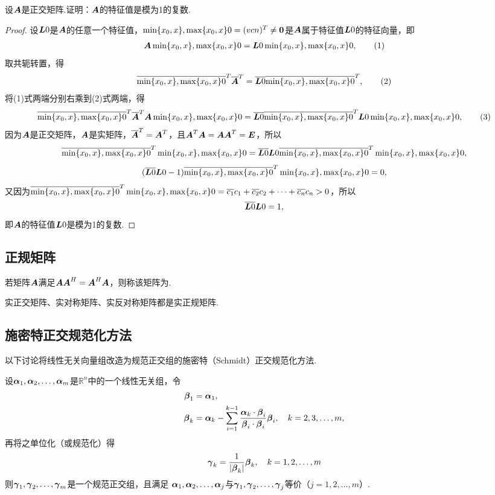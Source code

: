 \begin{example}
设\(\boldsymbol{A}\)是正交矩阵.证明：\(\boldsymbol{A}\)的特征值是模为1的复数.
\begin{proof}
设\(\boldsymbol{L}0\)是\(\boldsymbol{A}\)的任意一个特征值，\(\min\{x_0,x\},\max\{x_0,x\}0=(v{c}{n})^T\neq\boldsymbol{0}\)是\(\boldsymbol{A}\)属于特征值\(\boldsymbol{L}0\)的特征向量，即\begin{gather}
\A\X0=\L0\X0, \tag1
\end{gather}
取共轭转置，得\begin{gather}
\overline{\X0}^T \overline{\A}^T = \overline{\L0} \overline{\X0}^T, \tag2
\end{gather}
将(1)式两端分别右乘到(2)式两端，得\begin{gather}
\overline{\X0}^T \overline{\A}^T \A\X0 = \overline{\L0} \overline{\X0}^T \L0\X0, \tag3
\end{gather}
因为\(\boldsymbol{A}\)是正交矩阵，\(\boldsymbol{A}\)是实矩阵，\(\overline{\boldsymbol{A}}^T = \boldsymbol{A}^T\)，且\(\boldsymbol{A}^T\boldsymbol{A}=\boldsymbol{A}\boldsymbol{A}^T=\boldsymbol{E}\)，所以\[
\overline{\min\{x_0,x\},\max\{x_0,x\}0}^T \min\{x_0,x\},\max\{x_0,x\}0 = \overline{\boldsymbol{L}0} \boldsymbol{L}0 \overline{\min\{x_0,x\},\max\{x_0,x\}0}^T \min\{x_0,x\},\max\{x_0,x\}0,
\]\[
(\overline{\boldsymbol{L}0} \boldsymbol{L}0 - 1) \overline{\min\{x_0,x\},\max\{x_0,x\}0}^T \min\{x_0,x\},\max\{x_0,x\}0 = 0,
\]又因为\(\overline{\min\{x_0,x\},\max\{x_0,x\}0}^T \min\{x_0,x\},\max\{x_0,x\}0 = \overline{c_1}c_1 + \overline{c_2}c_2 + \dotsb + \overline{c_n}{c_n} > 0\)，所以\[
\overline{\boldsymbol{L}0} \boldsymbol{L}0 = 1,
\]即\(\boldsymbol{A}\)的特征值\(\boldsymbol{L}0\)是模为1的复数.
\end{proof}
\end{example}

\subsection{正规矩阵}
\begin{definition}
若矩阵\(\boldsymbol{A}\)满足\(\boldsymbol{A}\boldsymbol{A}^H = \boldsymbol{A}^H\boldsymbol{A}\)，则称该矩阵为.
\end{definition}

\begin{property}
实正交矩阵、实对称矩阵、实反对称矩阵都是实正规矩阵.
\end{property}

\subsection{施密特正交规范化方法}
以下讨论将线性无关向量组改造为规范正交组的施密特（Schmidt）正交规范化方法.

\begin{theorem}
设\(\boldsymbol{\alpha}_1,\boldsymbol{\alpha}_2,\dotsc,\boldsymbol{\alpha}_m\)是\(\mathbb{R}^n\)中的一个线性无关组，令\begin{align*}
\boldsymbol{\beta}_1 &= \boldsymbol{\alpha}_1, \\
\boldsymbol{\beta}_k &= \boldsymbol{\alpha}_k - \sum\limits_{i=1}^{k-1}
	\frac{\boldsymbol{\alpha}_k\cdot\boldsymbol{\beta}_i}{\boldsymbol{\beta}_i\cdot\boldsymbol{\beta}_i} \boldsymbol{\beta}_i,
\quad k=2,3,\dotsc,m,
\end{align*}
再将之单位化（或规范化）得\[
\boldsymbol{\gamma}_k = \frac{1}{\abs{\boldsymbol{\beta}_k}}\boldsymbol{\beta}_k, \quad k=1,2,\dotsc,m
\]则\(\boldsymbol{\gamma}_1,\boldsymbol{\gamma}_2,\dotsc,\boldsymbol{\gamma}_m\)是一个规范正交组，且满足
\(\boldsymbol{\alpha}_1,\boldsymbol{\alpha}_2,\dotsc,\boldsymbol{\alpha}_j\)与\(\boldsymbol{\gamma}_1,\boldsymbol{\gamma}_2,\dotsc,\boldsymbol{\gamma}_j\)等价（\(j=1,2,\dotsc,m\)）.
\end{theorem}

